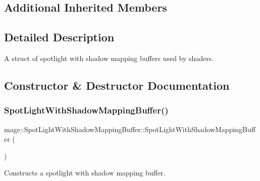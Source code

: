 \subsection*{Additional Inherited Members}


\subsection{Detailed Description}
A struct of spotlight with shadow mapping buffers used by shaders. 

\subsection{Constructor \& Destructor Documentation}
\hypertarget{structmage_1_1_spot_light_with_shadow_mapping_buffer_a96d597bc25801b19e38d3eefa0d662f1}{}\label{structmage_1_1_spot_light_with_shadow_mapping_buffer_a96d597bc25801b19e38d3eefa0d662f1} 
\subsubsection{\texorpdfstring{Spot\+Light\+With\+Shadow\+Mapping\+Buffer()}{SpotLightWithShadowMappingBuffer()}\hspace{0.1cm}{\footnotesize\ttfamily [1/3]}}
{\footnotesize\ttfamily mage\+::\+Spot\+Light\+With\+Shadow\+Mapping\+Buffer\+::\+Spot\+Light\+With\+Shadow\+Mapping\+Buffer (\begin{DoxyParamCaption}{ }\end{DoxyParamCaption})}

Constructs a spotlight with shadow mapping buffer. \hypertarget{structmage_1_1_spot_light_with_shadow_mapping_buffer_aa9078fd9b347d633b48fb8bbb330d54e}{}\label{structmage_1_1_spot_light_with_shadow_mapping_buffer_aa9078fd9b347d633b48fb8bbb330d54e} 
